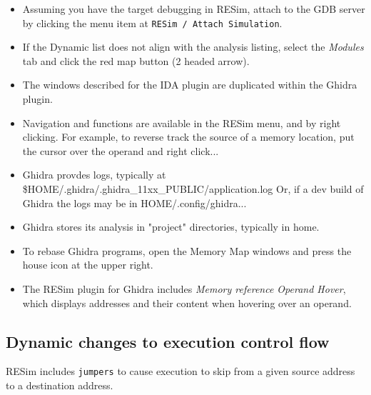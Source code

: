 \documentclass[titlepage]{article}
\begin{document}
\begin{itemize}
\item Assuming you have the target debugging in RESim, attach to the GDB server by clicking the menu item at {\tt RESim / Attach Simulation}.

\item If the Dynamic list does not align with the analysis listing, select the \textit{Modules} tab and click the red map button (2 headed arrow).

\item The windows described for the IDA plugin are duplicated within the Ghidra plugin.

\item Navigation and functions are available in the RESim menu, and by right clicking.  For example, to reverse track
the source of a memory location, put the cursor over the operand and right click...

\item Ghidra provdes logs, typically at \$HOME/.ghidra/.ghidra\_11xx\_PUBLIC/application.log
Or, if a dev build of Ghidra the logs may be in HOME/.config/ghidra...

\item Ghidra stores its analysis in "project" directories, typically in home.

\item To rebase Ghidra programs, open the Memory Map windows and press the house icon at the upper right.

\item The RESim plugin for Ghidra includes \textit{Memory reference Operand Hover}, which displays addresses
and their content when hovering over an operand.


\end{itemize}

\subsection{Dynamic changes to execution control flow}
\label{dynamic_control_flow}
RESim includes {\tt jumpers} to cause execution to skip from a given source address to a destination address.
\end{document}
